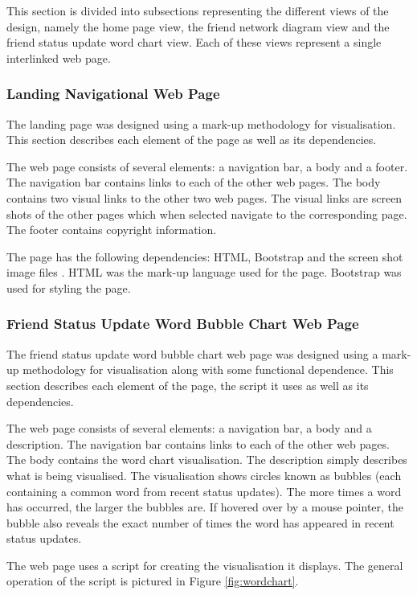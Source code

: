 \documentclass[12pt,onecolumn]{article}
\begin{document}
	This section is divided into subsections representing the different views of the design, namely the home page view, the friend network diagram view and the friend status update word chart view. Each of these views represent a single interlinked web page.
	
	\subsubsection{Landing Navigational Web Page}
	The landing page was designed using a mark-up methodology for visualisation. This section describes each element of the page as well as its dependencies.
	
	The web page consists of several elements: a navigation bar, a body and a footer. The navigation bar contains links to each of the other web pages. The body contains two visual links to the other two web pages. The visual links are screen shots of the other pages which when selected navigate to the corresponding page. The footer contains copyright information.
	
	The page has the following dependencies: HTML, Bootstrap and the screen shot image files \cite{Bootstrap}. HTML was the mark-up language used for the page. Bootstrap was used for styling the page.
	
	\subsubsection{Friend Status Update Word Bubble Chart Web Page}
	The friend status update word bubble chart web page was designed using a mark-up methodology for visualisation along with some functional dependence. This section describes each element of the page, the script it uses as well as its dependencies.
		
	The web page consists of several elements: a navigation bar, a body and a description. The navigation bar contains links to each of the other web pages. The body contains the word chart visualisation. The description simply describes what is being visualised. The visualisation shows circles known as bubbles (each containing a common word from recent status updates). The more times a word has occurred, the larger the bubbles are. If hovered over by a mouse pointer, the bubble also reveals the exact number of times the word has appeared in recent status updates.
	
	The web page uses a script for creating the visualisation it displays.  The general operation of the script is pictured in Figure \ref{fig:wordchart}.
	
\end{document}
